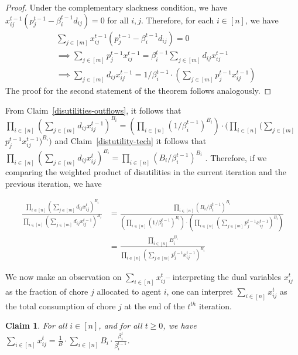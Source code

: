 \documentclass[format=acmsmall,authorversion]{acmart}
\newtheorem{claim}[theorem]{Claim}
\newcommand{\BRC}[1]{{\textcolor{red}{BRC: #1}}}
\begin{document}
\begin{proof}
    Under the complementary slackness condition, we have 
    $x^{t-1}_{ij}(p^{t-1}_j - \beta^{t-1}_id_{ij} ) = 0$ for all $i,j$. Therefore, for each $i \in [n]$, we have 
    \begin{align*}
        &\sum_{j \in [m]}x^{t-1}_{ij}(p^{t-1}_j - \beta^{t-1}_id_{ij}) = 0\\
        &\implies \sum_{j \in [m]}p^{t-1}_j x^{t-1}_{ij} = \beta^{t-1}_i \sum_{j \in [m]} d_{ij}x^{t-1}_{ij} \\
        &\implies \sum_{j \in [m]} d_{ij}x^{t-1}_{ij} = 1/\beta^{t-1}_i \cdot (\sum_{j \in [m]} p^{t-1}_j x^{t-1}_{ij}) 
    \end{align*}
    The proof for the second statement of the theorem follows analogously.
\end{proof}
From Claim~\ref{disutilities-outflows}, it follows that $\prod_{i \in [n]} (\sum_{j \in [m]}d_{ij}x^{t-1}_{ij})^{B_i} = (\prod_{i \in [n]} (1/\beta^{t-1}_i) ^{B_i}) \cdot (\prod_{i \in [n]} (\sum_{j \in [m]}$  $p^{t-1}_j x^{t-1}_{ij})^{B_i})$ and Claim~\ref{distutility-tech} it follows that $\prod_{i \in [n]} (\sum_{j \in [m]}d_{ij}x^{t}_{ij})^{B_i} = \prod_{i \in [n]} (B_i/\beta^{t-1}_{i})^{B_i}$ . Therefore, if we comparing the weighted product of disutilities in the current iteration and the previous iteration, we have

\begin{align*}
  \frac{\prod_{i \in [n]} (\sum_{j \in [m]} d_{ij}x^t_{ij})^{B_i}}{\prod_{i \in [n]} (\sum_{j \in [m]} d_{ij}x^{t-1}_{ij})^{B_i}} &= \frac{\prod_{i \in [n]} (B_i/\beta^{t-1}_i)^{B_i}}{(\prod_{i \in [n]} (1/\beta^{t-1}_i)^{B_i} ) \cdot (\prod_{i \in [n]} (\sum_{j \in [m]}p^{t-1}_j x^{t-1}_{ij})^{B_i})}\\
  &= \frac{\prod_{i\in [n]} B_i^{B_i}}{\prod_{i \in [n]}(\sum_{j \in [m]}p^{t-1}_j x^{t-1}_{ij})^{B_i}}
\end{align*}

We now make an observation on $\sum_{i \in [n]}x^t_{ij}$-- interpreting the dual variables $x^t_{ij}$ as the fraction of chore $j$ allocated to agent $i$, one can interpret $\sum_{i \in [n]}x^t_{ij}$ as the total consumption of chore $j$ at the end of the $t^{\mathit{th}}$ iteration. %

\begin{claim}
    \label{Allocation-claim}
    For all $i \in [n]$, and for all $t \geq 0$, we have $\sum_{i \in [n]} x^t_{ij} =  \frac{1}{B} \cdot \sum_{i \in [n]} B_i \cdot \frac{\beta^{t}_i}{\beta^{t-1}_i}$. %
\end{claim}
\end{document}
